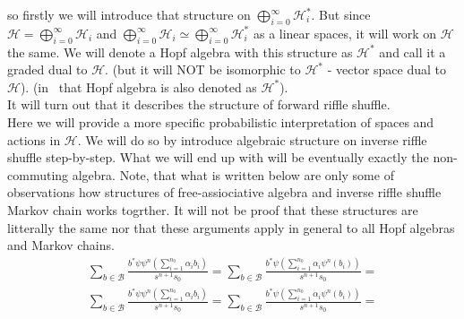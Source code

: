\documentclass[a4paper]{article}
\begin{document}
so firstly we will introduce that structure on
$\displaystyle\bigoplus^{\infty}_{i = 0} \mathcal{H}_i^*$. But since $\mathcal{H} =
\displaystyle\bigoplus^{\infty}_{i = 0} \mathcal{H}_i$ and $\displaystyle\bigoplus^{\infty}_{i = 0}
\mathcal{H}_i \simeq \displaystyle\bigoplus^{\infty}_{i = 0} \mathcal{H}_i^*$ as a linear spaces, it will
work on $\mathcal{H}$ the same. We will denote a Hopf algebra with this structure
as $\mathcal{H}^*$ and call it a graded dual to $\mathcal{H}$. (but it will NOT be isomorphic to
$\mathcal{H}^*$ - vector space dual to $\mathcal{H}$). (in~\cite{Diaconis2014} that Hopf algebra is also
denoted as $\mathcal{H}^*$).  \\
It will turn out that it describes the structure of forward riffle shuffle. \\

Here we will provide a more specific probabilistic interpretation of spaces and actions in $\mathcal{H}$.
We will do so by introduce algebraic structure on inverse riffle shuffle step-by-step. What we will end
up with will be eventually exactly the non-commuting algebra. Note, that what is written below are only
some of observations how structures of free-assiociative algebra and inverse riffle shuffle Markov chain
works togrther. It will not be proof that these structures are litterally the same nor that these arguments
apply  in general to all Hopf algebras and Markov chains.\\[4pt]
\begin{gather*}
\sum_{b\in\mathcal{B}}\frac{b^*\psi\psi^n \left(
\displaystyle\sum_{i = 1}^{n_0}\alpha_ib_i\right)}{s^{n+1}s_0} =
\sum_{b \in \mathcal{B}}\frac{b^*\psi\left(
\displaystyle\sum_{i = 1}^{n_0}\alpha_i\psi^n(b_i)\right)}{s^{n+1}s_0} = \\
\sum_{b\in\mathcal{B}}\frac{b^*\psi\psi^n \left(
\displaystyle\sum_{i = 1}^{n_0}\alpha_ib_i\right)}{s^{n+1}s_0} =
\sum_{b \in \mathcal{B}}\frac{b^*\psi\left(
\displaystyle\sum_{i = 1}^{n_0}\alpha_i\psi^n(b_i)\right)}{s^{n+1}s_0} = \\
\end{gather*}
\end{document}
